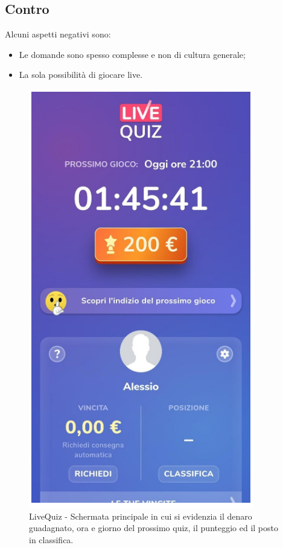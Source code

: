 \documentclass{article}
\begin{document}
\subsection{Contro}
Alcuni aspetti negativi sono:
\begin{itemize}
\item Le domande sono spesso complesse e non di cultura generale;
\item La sola possibilità di giocare live.
\end{itemize}

\begin{figure}[htp]
\begin{center}
\includegraphics[width=0.5 \textwidth]{Figure4.png}
\caption{LiveQuiz - Schermata principale in cui si evidenzia il denaro guadagnato, ora e giorno del prossimo quiz, il punteggio ed il posto in classifica.
}
\end{center}
\end{figure}
\end{document}
